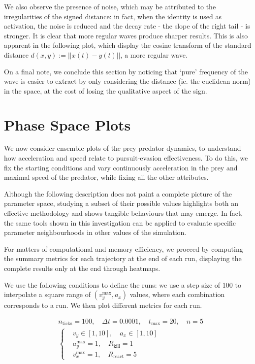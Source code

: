 \documentclass[10pt, twocolumn]{article}
\begin{document}
        We also observe the presence of noise, which may be attributed to the irregularities of the signed distance: in fact, when the identity is used as activation, the noise is reduced and the decay rate - the slope of the right tail - is stronger. It is clear that more regular waves produce sharper results. This is also apparent in the following plot, which display the cosine transform of the standard distance $d(x,y) := ||x(t)-y(t)||$, a more regular wave.

        On a final note, we conclude this section by noticing that `pure' frequency of the wave is easier to extract by only considering the distance (ie. the euclidean norm) in the space, at the cost of losing the qualitative aspect of the sign.

        \section{Phase Space Plots}
        We now consider ensemble plots of the prey-predator dynamics, to understand how acceleration and speed relate to pursuit-evasion effectiveness. To do this, we fix the starting conditions and vary continuously acceleration in the prey and maximal speed of the predator, while fixing all the other attributes.

        Although the following description does not paint a complete picture of the parameter space, studying a subset of their possible values highlights both an effective methodology and shows tangible behaviours that may emerge. In fact, the same tools shown in this investigation can be applied to evaluate specific parameter neighbourhoods in other values of the simulation.

        For matters of computational and memory efficiency, we proceed by computing the summary metrics for each trajectory at the end of each run, displaying the complete results only at the end through heatmaps.

        We use the following conditions to define the runs: we use a step size of 100 to interpolate a square range of $(v^\text{max}_y, a_x)$ values, where each combination corresponds to a run. We then plot different metrics for each run.

        \[
          \begin{aligned}
            &n_{\text{ticks}} = 100, \quad \Delta t = 0.0001,\quad t_{\text{max}} = 20,\quad n = 5 \\
            &\left\{
              \begin{aligned}
                &v_y \in [1, 10],\quad a_x \in [1, 10] \\
                &a^{\text{max}}_y = 1,\quad R_{\text{kill}} = 1 \\
                &v^{\text{max}}_x = 1,\quad R_{\text{react}} = 5
              \end{aligned}
              \right.
            \end{aligned}
          \]
\end{document}
